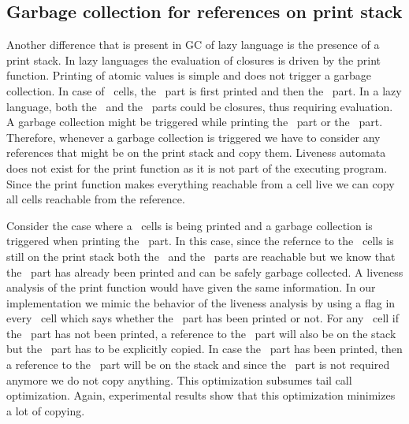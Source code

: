 \documentclass[9pt]{sigplanconf}
\newcommand{\comment}[1]{{\color{Myblue}{(#1)}}}
\newcommand{\cred}[1]{{\color{red}{#1}}}
\begin{document}
\subsection{Garbage collection for references on print stack}
Another  difference that is  present in  GC of  lazy language  is the
presence  of  a print  stack.  In  lazy  languages the  evaluation  of
closures is  driven by the print  function\comment{Refer to SPJ's
book}.  
Printing of atomic values is simple and does not trigger a garbage collection.
In case of \CONS\ cells, the \CAR\ part is first printed and then the \CDR\ part.
In a lazy language, both the \CAR\ and the \CDR\ parts could be closures, thus 
requiring evaluation. A garbage collection might be triggered while printing 
the \CAR\ part or the \CDR\ part. Therefore, whenever a garbage collection is 
triggered we have to consider any references that might be on the print stack 
and copy them. Liveness automata does not exist for the print function as it 
is not part of the executing program. Since the print function makes everything 
reachable from a cell live we can copy all cells reachable from the reference. 


Consider the case where a \CONS\ cells is being printed and a garbage collection 
is triggered when printing the \CDR\ part. In this case, since the refernce to the 
\CONS\ cells is still on the print stack both the \CAR\ and the \CDR\ parts are 
reachable but we know that the \CAR\ part has already been printed and can be 
safely garbage collected. A liveness analysis of the print function would have 
given the same information. In our implementation we mimic the behavior of 
the liveness analysis by using a flag in every \CONS\ cell which says whether 
the \CAR\ part has been printed or not. For any \CONS\ cell if the \CAR\ part 
has not been printed, a reference to the \CAR\ part will also be on the stack but 
the \CDR\ part has to be explicitly copied.  
In case the \CAR\ part has been printed, then a reference to the \CDR\ part will 
be on the stack and since the \CAR\ part is not required anymore we do not 
copy anything. This optimization subsumes tail call optimization. Again, 
experimental results show that this optimization minimizes a lot of copying. 
\cred{Very sketchy: Make another attempt to write}

\end{document}
